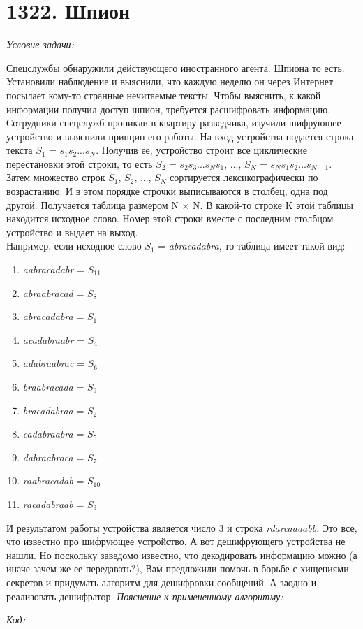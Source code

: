 \section{1322. Шпион}
\textit{Условие задачи:} \par
Спецслужбы обнаружили действующего иностранного агента. Шпиона то есть. Установили наблюдение и выяснили, что каждую
неделю он через Интернет посылает кому-то странные нечитаемые тексты. Чтобы выяснить, к какой информации получил доступ
шпион, требуется расшифровать информацию. Сотрудники спецслужб проникли в квартиру разведчика, изучили шифрующее устройство
и выяснили принцип его работы. На вход устройства подается строка текста $S_1$ = $s_1$$s_2$...$s_N$. Получив ее, устройство
строит все циклические перестановки этой строки, то есть $S_2$ = $s_2$$s_3$...$s_N$$s_1$, ..., $S_N$ = $s_N$$s_1$$s_2$...$s_{N-1}$.
Затем множество строк $S_1$, $S_2$, ..., $S_N$ сортируется лексикографически по возрастанию. И в этом порядке строчки
выписываются в столбец, одна под другой. Получается таблица размером N $\times$ N. В какой-то строке K этой таблицы
находится исходное слово. Номер этой строки вместе с последним столбцом устройство и выдает на выход.\\
Например, если исходное слово $S_1$ = \textit{abracadabra}, то таблица имеет такой вид:
\begin{enumerate}
    \item \textit{aabracadabr} = $S_11$
    \item \textit{abraabracad} = $S_8$
    \item \textit{abracadabra} = $S_1$
    \item \textit{acadabraabr} = $S_4$
    \item \textit{adabraabrac} = $S_6$
    \item \textit{braabracada} = $S_9$
    \item \textit{bracadabraa} = $S_2$
    \item \textit{cadabraabra} = $S_5$
    \item \textit{dabraabraca} = $S_7$
    \item \textit{raabracadab} = $S_10$
    \item \textit{racadabraab} = $S_3$
\end{enumerate}
И результатом работы устройства является число 3 и строка \textit{rdarcaaaabb}.
Это все, что известно про шифрующее устройство. А вот дешифрующего устройства не нашли. Но поскольку заведомо известно,
что декодировать информацию можно (а иначе зачем же ее передавать?), Вам предложили помочь в борьбе с хищениями секретов
и придумать алгоритм для дешифровки сообщений. А заодно и реализовать дешифратор.
\textit{Пояснение к примененному алгоритму:} \par
\BgThispage
\newpage
\textit{Код:}
\small
\begin{center}
    \begin{verbatim}
    \end{verbatim}
\end{center}
\normalsize
\BgThispage
\newpage


